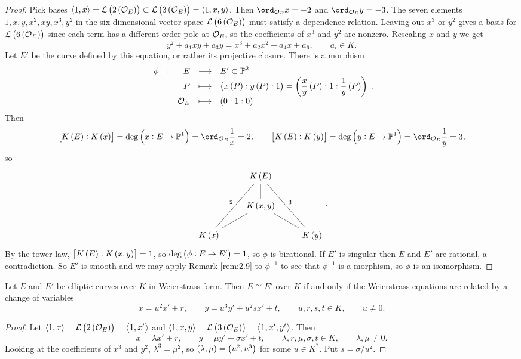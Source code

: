 \begin{proof}
Pick bases $ \abr{1, x} = \LLL\br{2\br{\OOO_E}} \subset \LLL\br{3\br{\OOO_E}} = \abr{1, x, y} $. Then $ \ord_{\OOO_E} x = -2 $ and $ \ord_{\OOO_E} y = -3 $. The seven elements $ 1, x, y, x^2, xy, x^3, y^2 $ in the six-dimensional vector space $ \LLL\br{6\br{\OOO_E}} $ must satisfy a dependence relation. Leaving out $ x^3 $ or $ y^2 $ gives a basis for $ \LLL\br{6\br{\OOO_E}} $ since each term has a different order pole at $ \mathcal{O}_E $, so the coefficients of $ x^3 $ and $ y^2 $ are nonzero. Rescaling $ x $ and $ y $ we get
$$ y^2 + a_1xy + a_3y = x^3 + a_2x^2 + a_4x + a_6, \qquad a_i \in K. $$
Let $ E' $ be the curve defined by this equation, or rather its projective closure. There is a morphism
$$ \functions[\phi]{E}{E' \subset \PP^2}{P}{\br{x\br{P} : y\br{P} : 1} = \br{\dfrac{x}{y}\br{P} : 1 : \dfrac{1}{y}\br{P}}}{\OOO_E}{\br{0 : 1 : 0}}. $$
Then
$$ \sbr{K\br{E} : K\br{x}} = \deg \br{x : E \to \PP^1} = \ord_{\OOO_E} \dfrac{1}{x} = 2, \qquad \sbr{K\br{E} : K\br{y}} = \deg \br{y : E \to \PP^1} = \ord_{\OOO_E} \dfrac{1}{y} = 3, $$
so
$$
\begin{tikzcd}
& K\br{E} \arrow[dash]{d} \arrow[dash]{ddl}[swap]{2} \arrow[dash]{ddr}{3} & \\
& K\br{x, y} \arrow[dash]{dl} \arrow[dash]{dr} & \\
K\br{x} & & K\br{y}
\end{tikzcd}.
$$
By the tower law, $ \sbr{K\br{E} : K\br{x, y}} = 1 $, so $ \deg \br{\phi : E \to E'} = 1 $, so $ \phi $ is birational. If $ E' $ is singular then $ E $ and $ E' $ are rational, a contradiction. So $ E' $ is smooth and we may apply Remark \ref{rem:2.9} to $ \phi^{-1} $ to see that $ \phi^{-1} $ is a morphism, so $ \phi $ is an isomorphism.
\end{proof}


\begin{proposition}
\label{prop:3.2}
Let $ E $ and $ E' $ be elliptic curves over $ K $ in Weierstrass form. Then $ E \cong E' $ over $ K $ if and only if the Weierstrass equations are related by a change of variables
$$ x = u^2x' + r, \qquad y = u^3y' + u^2sx' + t, \qquad u, r, s, t \in K, \qquad u \ne 0. $$
\end{proposition}

\begin{proof}
Let $ \abr{1, x} = \LLL\br{2\br{\OOO_E}} = \abr{1, x'} $ and $ \abr{1, x, y} = \LLL\br{3\br{\OOO_E}} = \abr{1, x', y'} $. Then
$$ x = \lambda x' + r, \qquad y = \mu y' + \sigma x' + t, \qquad \lambda, r, \mu, \sigma, t \in K, \qquad \lambda, \mu \ne 0. $$
Looking at the coefficients of $ x^3 $ and $ y^2 $, $ \lambda^3 = \mu^2 $, so $ \br{\lambda, \mu} = \br{u^2, u^3} $ for some $ u \in K^* $. Put $ s = \sigma / u^2 $.
\end{proof}

